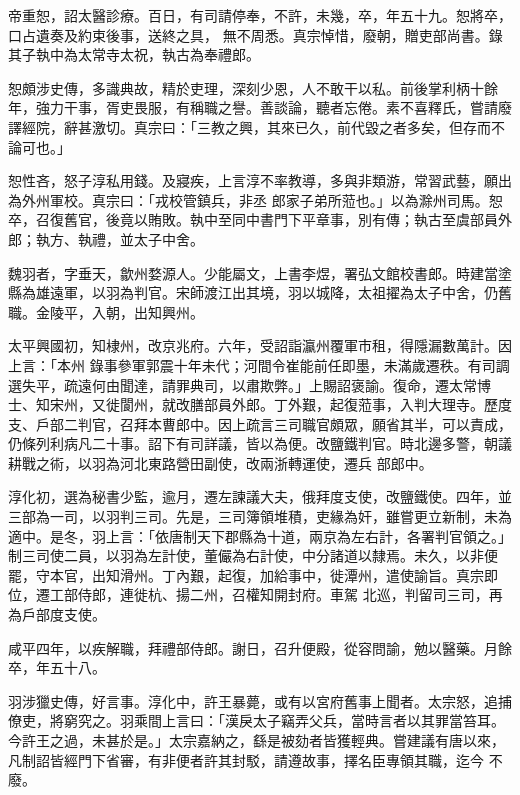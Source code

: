 \begin{pinyinscope}
 帝重恕，詔太醫診療。百日，有司請停奉，不許，未幾，卒，年五十九。恕將卒，口占遺奏及約束後事，送終之具，
 無不周悉。真宗悼惜，廢朝，贈吏部尚書。錄其子執中為太常寺太祝，執古為奉禮郎。



 恕頗涉史傳，多識典故，精於吏理，深刻少恩，人不敢干以私。前後掌利柄十餘年，強力干事，胥吏畏服，有稱職之譽。善談論，聽者忘倦。素不喜釋氏，嘗請廢譯經院，辭甚激切。真宗曰：「三教之興，其來已久，前代毀之者多矣，但存而不論可也。」



 恕性吝，怒子淳私用錢。及寢疾，上言淳不率教導，多與非類游，常習武藝，願出為外州軍校。真宗曰：「戎校管鎮兵，非丞
 郎家子弟所蒞也。」以為滁州司馬。恕卒，召復舊官，後竟以賄敗。執中至同中書門下平章事，別有傳；執古至虞部員外郎；執方、執禮，並太子中舍。



 魏羽者，字垂天，歙州婺源人。少能屬文，上書李煜，署弘文館校書郎。時建當塗縣為雄遠軍，以羽為判官。宋師渡江出其境，羽以城降，太祖擢為太子中舍，仍舊職。金陵平，入朝，出知興州。



 太平興國初，知棣州，改京兆府。六年，受詔詣瀛州覆軍市租，得隱漏數萬計。因上言：「本州
 錄事參軍郭震十年未代；河間令崔能前任即墨，未滿歲遷秩。有司調選失平，疏遠何由聞達，請罪典司，以肅欺弊。」上賜詔褒諭。復命，遷太常博士、知宋州，又徙閬州，就改膳部員外郎。丁外艱，起復蒞事，入判大理寺。歷度支、戶部二判官，召拜本曹郎中。因上疏言三司職官頗眾，願省其半，可以責成，仍條列利病凡二十事。詔下有司詳議，皆以為便。改鹽鐵判官。時北邊多警，朝議耕戰之術，以羽為河北東路營田副使，改兩浙轉運使，遷兵
 部郎中。



 淳化初，選為秘書少監，逾月，遷左諫議大夫，俄拜度支使，改鹽鐵使。四年，並三部為一司，以羽判三司。先是，三司簿領堆積，吏緣為奸，雖嘗更立新制，未為適中。是冬，羽上言：「依唐制天下郡縣為十道，兩京為左右計，各署判官領之。」制三司使二員，以羽為左計使，董儼為右計使，中分諸道以隸焉。未久，以非便罷，守本官，出知滑州。丁內艱，起復，加給事中，徙潭州，遣使諭旨。真宗即位，遷工部侍郎，連徙杭、揚二州，召權知開封府。車駕
 北巡，判留司三司，再為戶部度支使。



 咸平四年，以疾解職，拜禮部侍郎。謝日，召升便殿，從容問諭，勉以醫藥。月餘卒，年五十八。



 羽涉獵史傳，好言事。淳化中，許王暴薨，或有以宮府舊事上聞者。太宗怒，追捕僚吏，將窮究之。羽乘間上言曰：「漢戾太子竊弄父兵，當時言者以其罪當笞耳。今許王之過，未甚於是。」太宗嘉納之，繇是被劾者皆獲輕典。嘗建議有唐以來，凡制詔皆經門下省審，有非便者許其封駁，請遵故事，擇名臣專領其職，迄今
 不廢。




\end{pinyinscope}
